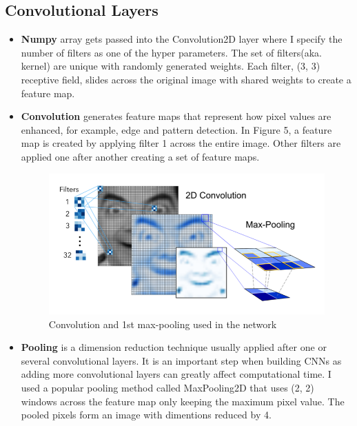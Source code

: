 \subsection{Convolutional Layers}
\begin{itemize}
	\item \textbf{Numpy} array gets passed into the Convolution2D layer where I specify the number of filters as one of the hyper parameters. The set of filters(aka. kernel) are unique with randomly generated weights. Each filter, (3, 3) receptive field, slides across the original image with shared weights to create a feature map.
	\item \textbf{Convolution} generates feature maps that represent how pixel values are enhanced, for example, edge and pattern detection. In Figure 5, a feature map is created by applying filter 1 across the entire image. Other filters are applied one after another creating a set of feature maps.
	
	\begin{figure}[h]
		\centering\includegraphics{images/conv_maxpool.png}
		\caption{Convolution and 1st max-pooling used in the network}
	\end{figure}

	\item \textbf{Pooling} is a dimension reduction technique usually applied after one or several convolutional layers. It is an important step when building CNNs as adding more convolutional layers can greatly affect computational time. I used a popular pooling method called MaxPooling2D that uses (2, 2) windows across the feature map only keeping the maximum pixel value. The pooled pixels form an image with dimentions reduced by 4.
\end{itemize}

